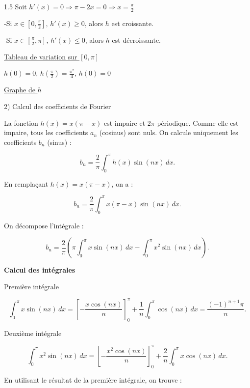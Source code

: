 \documentclass[12pt]{article}
\begin{document}
\begin{spacing}{1.5}
Soit $h'(x)=0\Rightarrow \pi-2x=0\Rightarrow x=\frac{\pi}{2}$

-Si $x\in [0,\frac{\pi}{2}]$, $h'(x)\geq 0$, alors $h$ est croissante.

-Si $x\in [\frac{\pi}{2},\pi]$, $h'(x)\leq 0$, alors $h$ est décroissante.

\medskip
\underline{Tableau de variation sur $[0,\pi]$}

$h(0)=0$, $h(\frac{\pi}{2})=\frac{\pi^2}{4}$, $h(0)=0$

\begin{center}
\end{center}

\medskip
\underline{Graphe de $h$}
 
 
 

 


2) Calcul des coefficients de Fourier

La fonction \( h(x) = x(\pi - x) \) est impaire et \( 2\pi \)-périodique. Comme elle est impaire, tous les coefficients \( a_n \) (cosinus) sont nuls. On calcule uniquement les coefficients \( b_n \) (sinus) :

\[
b_n = \frac{2}{\pi} \int_0^\pi h(x) \sin(nx) \, dx.
\]

En remplaçant \( h(x) = x(\pi - x) \), on a :

\[
b_n = \frac{2}{\pi} \int_0^\pi x(\pi - x) \sin(nx) \, dx.
\]

On décompose l'intégrale :

\[
b_n = \frac{2}{\pi} \left( \pi \int_0^\pi x \sin(nx) \, dx - \int_0^\pi x^2 \sin(nx) \, dx \right).
\]

\textbf{Calcul des intégrales}

Première intégrale

\[
\int_0^\pi x \sin(nx) \, dx = \left[ -\frac{x \cos(nx)}{n} \right]_0^\pi + \frac{1}{n} \int_0^\pi \cos(nx) \, dx = \frac{(-1)^{n+1} \pi}{n}.
\]

Deuxième intégrale

\[
\int_0^\pi x^2 \sin(nx) \, dx = \left[ -\frac{x^2 \cos(nx)}{n} \right]_0^\pi + \frac{2}{n} \int_0^\pi x \cos(nx) \, dx.
\]

En utilisant le résultat de la première intégrale, on trouve :


\end{spacing}
\end{document}
